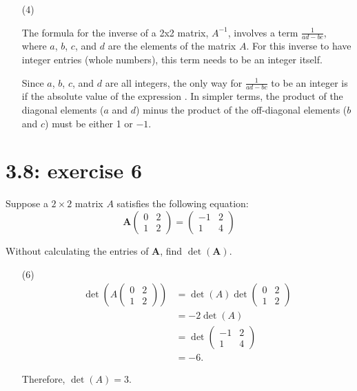 \documentclass{report}
\begin{document}
\sol

\begin{enumerate}
\item[(4)]

The formula for the inverse of a 2x2 matrix, $A^{-1}$, involves a term $\frac{1}{ad-bc}$, where $a$, $b$, $c$, and $d$ are the elements of the matrix $A$. For this inverse to have integer entries (whole numbers), this term needs to be an integer itself.

Since $a$, $b$, $c$, and $d$ are all integers, the only way for $\frac{1}{ad-bc}$ to be an integer is if the absolute value of the expression  . In simpler terms, the product of the diagonal elements ($a$ and $d$) minus the product of the off-diagonal elements ($b$ and $c$) must be either 1 or $-1$.


\end{enumerate}



\section*{3.8: exercise 6} 
Suppose a $2\times 2$ matrix $A$ satisfies the following equation:
\begin{equation}
\mathbf{A} \begin{pmatrix} 0 & 2 \\ 1 & 2 \end{pmatrix} = \begin{pmatrix} -1 & 2 \\ 1 & 4 \end{pmatrix}
\end{equation}

Without calculating the entries of $\mathbf{A}$, find $\det(\mathbf{A})$.


\sol

\begin{enumerate}
\item[(6)]
\begin{align*}
\det \left(A \begin{pmatrix} 0 & 2 \\ 1 & 2 \end{pmatrix} \right) &= \det(A) \det \begin{pmatrix} 0 & 2 \\ 1 & 2 \end{pmatrix} \\
&= -2 \det(A) \\
&= \det \begin{pmatrix} -1 & 2 \\ 1 & 4 \end{pmatrix} \\
&= -6.
\end{align*}

Therefore, $\boxed{\det(A) = 3}$.

\end{enumerate}
\end{document}
